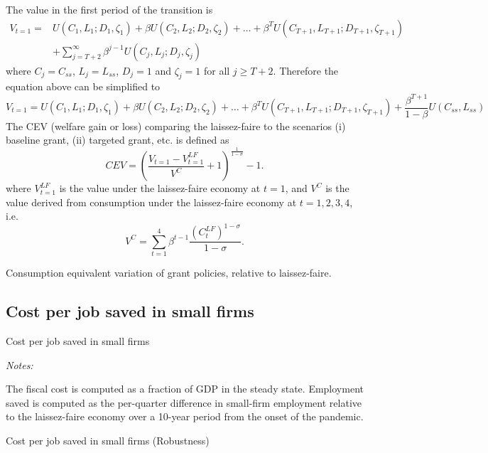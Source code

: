 \documentclass[11pt,english]{article}
\newcommand*{\TabDir}{../tables}
\begin{document}
The value in the first period of the transition is%
\begin{align*}
V_{t=1}=&U(C_{1},L_{1};D_1,\zeta _{1})+\beta U(C_{2},L_{2};D_2,\zeta _{2})+\ldots
+\beta ^{T}U(C_{T+1},L_{T+1};D_{T+1},\zeta _{T+1}) \\
& +\sum_{j=T+2}^{\infty }\beta
^{j-1}U(C_{j},L_{j};D_j,\zeta _{j})
\end{align*}%
where $C_{j}=C_{ss}$, $L_{j}=L_{ss}$, $D_j = 1$ and $\zeta_j=1$ for all $j\geq T+2$. Therefore the
equation above can be simplified to 
\begin{equation*}
V_{t=1}=U(C_{1},L_{1};D_1,\zeta _{1})+\beta U(C_{2},L_{2};D_2,\zeta _{2})+\ldots
+\beta ^{T}U(C_{T+1},L_{T+1};D_{T+1},\zeta _{T+1})+\frac{\beta ^{T+1}}{1-\beta }%
U(C_{ss},L_{ss})
\end{equation*}%
The CEV (welfare gain or loss) comparing the laissez-faire to the scenarios
(i) baseline grant, (ii) targeted grant, etc. is defined as 
%
\begin{equation*}
CEV=\left( \frac{V_{t=1}-V^{LF}_{t=1}}{V^C}+1\right) ^{\frac{1}{1-\sigma }%
}-1\text{.}
\end{equation*}
where $V^{LF}_{t=1}$ is the value under the laissez-faire economy at $t=1$, and $V^{C}$ is the value derived from consumption under the laissez-faire economy at $t=1,2,3,4$, i.e.
\begin{equation*}
V^C=\sum_{t=1}^4 \beta^{t-1} \frac{(C^{LF}_{t})^{1-\sigma }}{1-\sigma }.
\end{equation*}

		
\begin{table}[htbp]
	
	\caption{Consumption equivalent variation of grant policies, relative to laissez-faire.}
	
	\vspace{1ex}
\end{table}	
\FloatBarrier
	
\subsection{Cost per job saved in small firms}
	
\begin{table}[htbp]
	
	\caption{Cost per job saved in small firms}
	\vspace{1ex}
	
	{\textit{Notes:} \raggedright The fiscal cost is computed as a fraction of GDP in the steady state. Employment saved is computed as the per-quarter difference in small-firm employment relative to the laissez-faire economy over a 10-year period from the onset of the pandemic.    \par}		

\end{table}	

\begin{table}[htbp]
	
	\caption{Cost per job saved in small firms (Robustness)}		
	
\end{table}	
	
\end{document}
